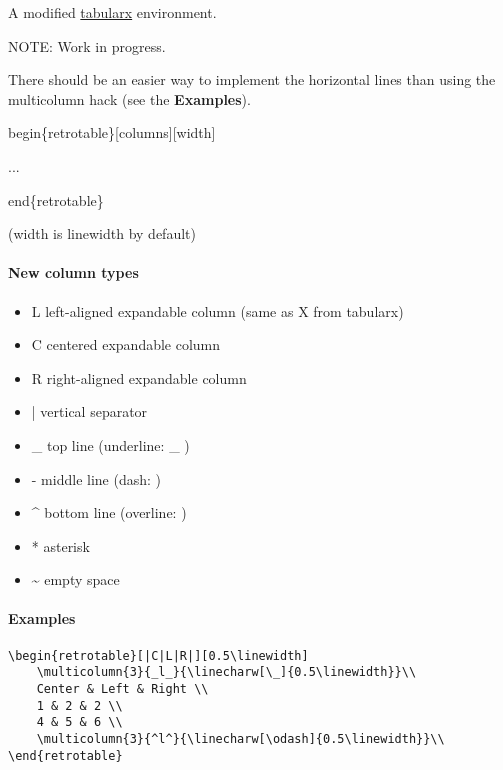 \documentclass[english,12pt,openany,letterpaper]{book}
\begin{document}
A modified \href{https://www.ctan.org/pkg/tabularx}{tabularx} environment.

\begin{tabbox}[4][4]
	\begin{headerbox}{NOTE:}
		Work in progress.
		
		There should be an easier way to implement the horizontal lines than using the \bs multicolumn hack (see the \textbf{Examples}).
	\end{headerbox}
\end{tabbox}

\bs begin\{retrotable\}[columns][width]

\tab ...

\bs end\{retrotable\}

(width is \bs linewidth by default)

\skipline

\paragraph{New column types}

\begin{itemize}
	\item L left-aligned expandable column (same as X from tabularx)
	\item C centered expandable column
	\item R right-aligned expandable column
	\item | vertical separator
	\item \_ top line (underline: \_ )
	\item - middle line (dash: \dash{} )
	\item \^{} bottom line (overline: \ol{~} )
	\item * asterisk
	\item \~{} empty space
\end{itemize}

\break

\paragraph{Examples}

\begin{verbatim}
\begin{retrotable}[|C|L|R|][0.5\linewidth]
    \multicolumn{3}{_l_}{\linecharw[\_]{0.5\linewidth}}\\
    Center & Left & Right \\
    1 & 2 & 2 \\
    4 & 5 & 6 \\
    \multicolumn{3}{^l^}{\linecharw[\odash]{0.5\linewidth}}\\
\end{retrotable}
\end{verbatim}
\end{document}
